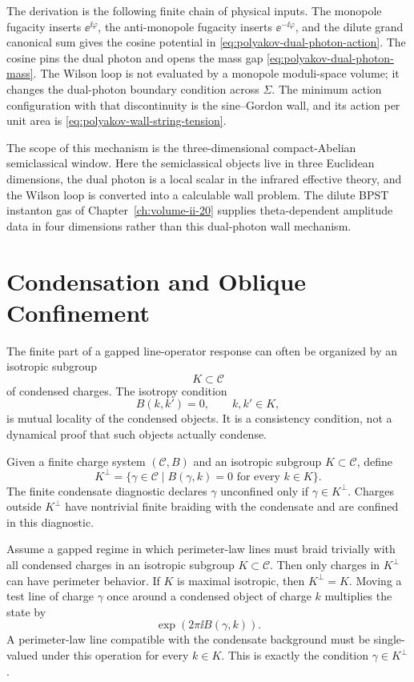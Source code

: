 \begin{controlledapproximation}
The derivation is the following finite chain of physical inputs.  The
monopole fugacity inserts \(\ee^{\ii\varphi}\), the anti-monopole fugacity
inserts \(\ee^{-\ii\varphi}\), and the dilute grand canonical sum gives the
cosine potential in
\eqref{eq:polyakov-dual-photon-action}.  The cosine pins the dual photon and
opens the mass gap \eqref{eq:polyakov-dual-photon-mass}.  The Wilson loop is
not evaluated by a monopole moduli-space volume; it changes the dual-photon
boundary condition across \(\Sigma\).  The minimum action configuration with
that discontinuity is the sine--Gordon wall, and its action per unit area is
\eqref{eq:polyakov-wall-string-tension}.

The scope of this mechanism is the three-dimensional compact-Abelian
semiclassical window.  Here the semiclassical objects live in three Euclidean
dimensions, the dual photon is a local scalar in the infrared effective
theory, and the Wilson loop is converted into a calculable wall problem.  The
dilute BPST instanton gas of Chapter~\ref{ch:volume-ii-20} supplies
theta-dependent amplitude data in four dimensions rather than this
dual-photon wall mechanism.
\end{controlledapproximation}

\section{Condensation and Oblique Confinement}

The finite part of a gapped line-operator response can often be organized by
an isotropic subgroup
\[
  K\subset\mathcal C
\]
of condensed charges.  The isotropy condition
\[
  B(k,k')=0,\qquad k,k'\in K,
\]
is mutual locality of the condensed objects.  It is a consistency condition,
not a dynamical proof that such objects actually condense.

\begin{definition}
\label{def:finite-confinement-diagnostic}
Given a finite charge system \((\mathcal C,B)\) and an isotropic subgroup
\(K\subset\mathcal C\), define
\[
  K^\perp=\{\gamma\in\mathcal C\mid B(\gamma,k)=0
  \text{ for every }k\in K\}.
\]
The finite condensate diagnostic declares \(\gamma\) unconfined only if
\(\gamma\in K^\perp\).  Charges outside \(K^\perp\) have nontrivial finite
braiding with the condensate and are confined in this diagnostic.
\end{definition}

Assume a gapped regime in which perimeter-law lines must braid trivially with
all condensed charges in an isotropic subgroup \(K\subset\mathcal C\).  Then
only charges in \(K^\perp\) can have perimeter behavior.  If \(K\) is maximal
isotropic, then \(K^\perp=K\).
Moving a test line of charge \(\gamma\) once around a condensed object of
charge \(k\) multiplies the state by
\[
  \exp(2\pi\ii B(\gamma,k)).
\]
A perimeter-law line compatible with the condensate background must be
single-valued under this operation for every \(k\in K\).  This is exactly the
condition \(\gamma\in K^\perp\).

